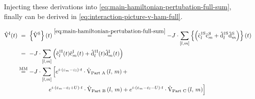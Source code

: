 Injecting these derivations into \autoref{eq:main-hamiltonian-pertubation-full-sum}, finally \VhamiltonianOfT[\interactionPicture] can be derived in \autoref{eq:interaction-picture-v-ham-full}.

\begin{equation}
    \label{eq:interaction-picture-v-ham-full}
    \begin{split}
        \VhamiltonianOfT[\interactionPicture] &
        \stackrel{\phantom{\text{MM}}}{=}
        \left\{\Vhamiltonian[\schroedingerPicture]\right\}(t) \stackrel{\ref{eq:main-hamiltonian-pertubation-full-sum}}{=}
        - J \cdot \fullneighborsum{l}{m}  \left\{
              \left(\cop[\schroedingerPicture]{l}{\dagger}\cop[\schroedingerPicture]{m}{} + \dop[\schroedingerPicture]{l}{\dagger}\dop[\schroedingerPicture]{m}{} \right)
        \right\}(t) \\
        &\stackrel{\phantom{\text{MM}}}{=}
        -J \cdot \fullneighborsum{l}{m}\left(\copOfT[\interactionPicture]{l}{\dagger}\copOfT[\interactionPicture]{m}{} + \dopOfT[\interactionPicture]{l}{\dagger}\dopOfT[\interactionPicture]{m}{} \right)\\
        &\stackrel{\text{MM}}{=}
        -J \cdot \fullneighborsum{l}{m} \left[
            e^{i\cdot \left(\epsl[m]-\epsl\right)\cdot t} \cdot \VhamiltonianPartA{l}{m} + 
            \right.\\
            &\qquad\qquad\quad
            \left.
            e^{i\cdot \left(\epsl[m]-\epsl + U\right)\cdot t} \cdot \VhamiltonianPartB{l}{m} + 
            e^{i\cdot \left(\epsl[m]-\epsl - U\right)\cdot t} \cdot \VhamiltonianPartC{l}{m} 
        \right]
    \end{split}
\end{equation}

